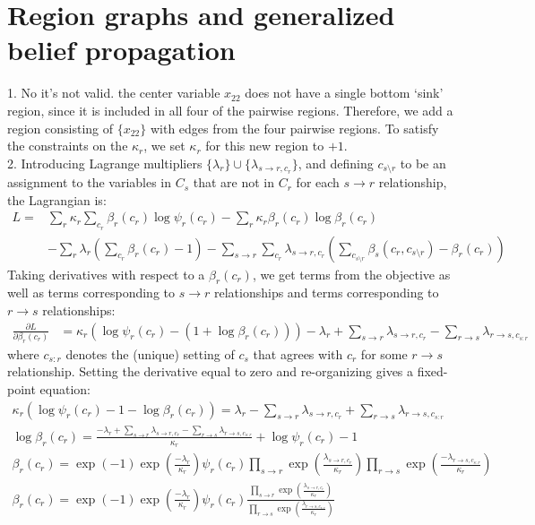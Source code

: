 \documentclass[11pt]{article}
\newcommand{\pd}[2]{\frac{\partial #1}{\partial #2}}
\begin{document}
\section{Region graphs and generalized belief propagation}
1. No it's not valid. the center variable $x_{22}$ does not have a single bottom `sink' region, since it is included in all four of the pairwise regions. Therefore, we add a region consisting of $\{x_{22}\}$ with edges from the four pairwise regions. To satisfy the constraints on the $\kappa_r$, we set $\kappa_r$ for this new region to $+1$.\\
2. Introducing Lagrange multipliers $\{\lambda_r\} \cup \{\lambda_{s \to r,c_r}\}$, and defining $c_{s \setminus r}$ to be an assignment to the variables in $C_s$ that are not in $C_r$ for each $s \to r$ relationship, the Lagrangian is:
\begin{align*}
  L = &\sum_r \kappa_r \sum_{c_r} \beta_r(c_r) \log \psi_r(c_r) - \sum_r \kappa_r \beta_r(c_r) \log \beta_r(c_r) \\
  &- \sum_r \lambda_r (\sum_{c_r} \beta_r(c_r) - 1) - \sum_{s \to r} \sum_{c_r} \lambda_{s \to r, c_r} ( \sum_{c_{s\setminus r}} \beta_s(c_r,c_{s \setminus r}) - \beta_r(c_r))
\end{align*}
Taking derivatives with respect to a $\beta_r(c_r)$, we get terms from the objective as well as terms corresponding to $s \to r$ relationships and terms corresponding to $r \to s$ relationships:
\begin{align*}
  \pd{L}{\beta_r(c_r)} &= \kappa_r \left( \log \psi_r(c_r) - (1 + \log \beta_r(c_r)) \right) - \lambda_r + \sum_{s \to r} \lambda_{s \to r, c_r} - \sum_{r \to s} \lambda_{r \to s, c_{s:r}}
\end{align*}
where $c_{s:r}$ denotes the (unique) setting of $c_s$ that agrees with $c_r$ for some $r \to s$ relationship. Setting the derivative equal to zero and re-organizing gives a fixed-point equation:
\begin{align*}
  \kappa_r \left( \log \psi_r(c_r) - 1 - \log \beta_r(c_r) \right) =  \lambda_r - \sum_{s \to r} \lambda_{s \to r, c_r} + \sum_{r \to s} \lambda_{r \to s, c_{s:r}}\\
  \log \beta_r(c_r) = \frac{-\lambda_r  + \sum_{s \to r} \lambda_{s \to r, c_r} - \sum_{r \to s} \lambda_{r \to s, c_{s:r}}}{\kappa_r} + \log \psi_r(c_r) - 1\\
  \beta_r(c_r) = \exp(-1) \exp(\frac{-\lambda_r}{\kappa_r})\psi_r(c_r) \prod_{s \to r}\exp(\frac{\lambda_{s \to r, c_r}}{\kappa_r}) \prod_{r \to s} \exp(\frac{- \lambda_{r \to s, c_{s:r}}}{\kappa_r})\\
  \beta_r(c_r) = \exp(-1) \exp(\frac{-\lambda_r}{\kappa_r})\psi_r(c_r) \frac{\prod_{s \to r}\exp(\frac{\lambda_{s \to r, c_r}}{\kappa_r})} {\prod_{r \to s} \exp(\frac{ \lambda_{r \to s, c_{s:r}}}{\kappa_r})}
\end{align*}
\end{document}
